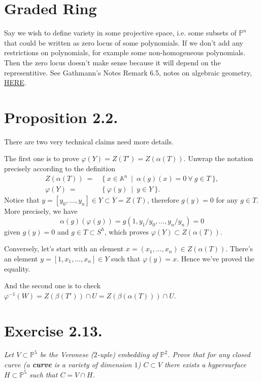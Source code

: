 \section{Graded Ring}

Say we wish to define variety in some projective space, i.e. some subsets of $\mathbb P^n$ that could be written as zero locus of some polynomials.
If we don't add any restrictions on polynomials, for example some non-homogeneous polynomials. 
Then the zero locus doesn't make sense because it will depend on the representitive. See Gathmann's Notes Remark 6.5, notes on algebraic geometry, \href{https://agag-gathmann.math.rptu.de/class/alggeom-2021/alggeom-2021-c6.pdf}{HERE}.

\section{Proposition 2.2.}

There are two very technical claims need more details. 

The first one is to prove $\varphi(Y)=Z(T')=Z(\alpha (T)).$
Unwrap the notation precisely according to the definition \begin{align*}
    Z(\alpha (T)) ~=&~ \{~ x\in \mathbb A^n ~\mid~ \alpha(g)(x)=0 ~\forall~ g\in T ~\},\\
    \varphi(Y) ~=&~ \{~ \varphi(y) ~\mid~ y\in Y ~\}.
\end{align*}
Notice that $y=[y_0,...,y_n]\in Y\subset \overline{Y}=Z(T)$, therefore $g(y)=0$ for any $g\in T$.
More precisely, we have 
\[\alpha(g)(\varphi(g))=g(1,y_1/y_0,...,y_n/y_n)=0\] given $g(y)=0$ and $g\in T\subset S^h$, which proves $\varphi(Y)\subset Z(\alpha (T))$.

Conversely, let's start with an element $x=(x_1,...,x_n)\in Z(\alpha (T))$. There's an element $y=[1,x_1,...,x_n]\in Y$ such that $\varphi(y)=x$. Hence we've proved the equality.

And the second one is to check $\varphi^{-1}(W)=Z(\beta(T'))\cap U=Z(\beta(\alpha(T)))\cap U$.


\section{Exercise 2.13.}
\textit{Let $V\subset \mathbb P^5$ be the Veronese ($2$-uple) embedding of $\mathbb P^2$. Prove that for any closed curve (a \textbf{curve} is a variety of dimension $1$) $C\subset V$ there exists a hypersurface $H\subset \mathbb P^5$ such that $C=V\cap H$.}

